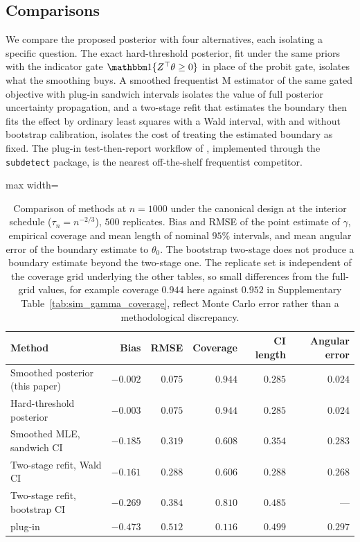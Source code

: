 \documentclass[11pt]{article}
\theoremstyle{definition}
\theoremstyle{plain}
\begin{document}
\subsection{Comparisons}
\label{sec:sim_comparisons}

We compare the proposed posterior with four alternatives, each isolating a specific question. The exact hard-threshold posterior, fit under the same priors with the indicator gate $\mathbbm 1\{Z^\top\theta\ge0\}$ in place of the probit gate, isolates what the smoothing buys. A smoothed frequentist M estimator of the same gated objective with plug-in sandwich intervals isolates the value of full posterior uncertainty propagation, and a two-stage refit that estimates the boundary then fits the effect by ordinary least squares with a Wald interval, with and without bootstrap calibration, isolates the cost of treating the estimated boundary as fixed. The plug-in test-then-report workflow of \citet{Fan2017}, implemented through the \texttt{subdetect} package, is the nearest off-the-shelf frequentist competitor.

\begin{table}[!htbp]
  \centering
  \caption{Comparison of methods at $n=1000$ under the canonical design at the interior schedule ($\tau_n=n^{-2/3}$), $500$ replicates. Bias and RMSE of the point estimate of $\gamma$, empirical coverage and mean length of nominal $95\%$ intervals, and mean angular error of the boundary estimate to $\theta_0$. The bootstrap two-stage does not produce a boundary estimate beyond the two-stage one. The replicate set is independent of the coverage grid underlying the other tables, so small differences from the full-grid values, for example coverage $0.944$ here against $0.952$ in Supplementary Table~\ref{tab:sim_gamma_coverage}, reflect Monte Carlo error rather than a methodological discrepancy.}
  \label{tab:sim_comparisons}
  \begin{adjustbox}{max width=\textwidth}
  \begin{tabular}{lrrrrr}
    \toprule
    Method & Bias & RMSE & Coverage & CI length & Angular error\\
    \midrule
    Smoothed posterior (this paper) & $-0.002$ & $0.075$ & $0.944$ & $0.285$ & $0.024$\\
    Hard-threshold posterior        & $-0.003$ & $0.075$ & $0.944$ & $0.285$ & $0.024$\\
    Smoothed MLE, sandwich CI       & $-0.185$ & $0.319$ & $0.608$ & $0.354$ & $0.283$\\
    Two-stage refit, Wald CI        & $-0.161$ & $0.288$ & $0.606$ & $0.288$ & $0.268$\\
    Two-stage refit, bootstrap CI   & $-0.269$ & $0.384$ & $0.810$ & $0.485$ & ---\\
    \citet{Fan2017} plug-in         & $-0.473$ & $0.512$ & $0.116$ & $0.499$ & $0.297$\\
    \bottomrule
  \end{tabular}
  \end{adjustbox}
\end{table}
\end{document}
